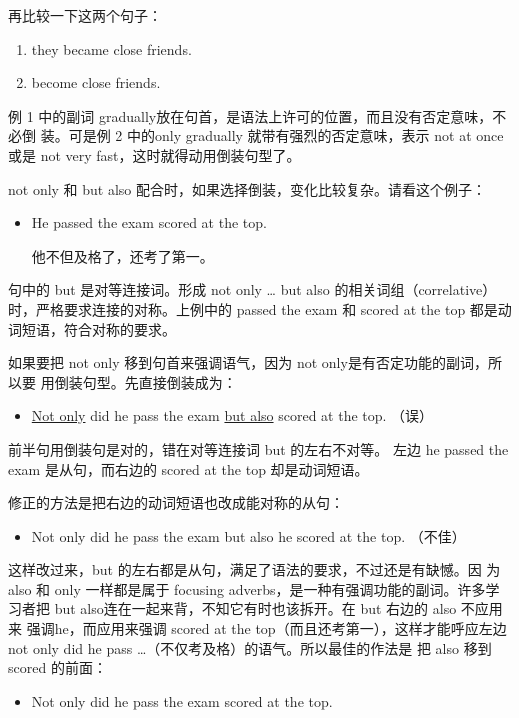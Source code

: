 再比较一下这两个句子：
\begin{enumerate}
\item {} they became close friends.
\item {} become close friends.
\end{enumerate}
例 1 中的副词 gradually放在句首，是语法上许可的位置，而且没有否定意味，不必倒
装。可是例 2 中的only gradually 就带有强烈的否定意味，表示 not at
once 或是 not very fast，这时就得动用倒装句型了。

not only 和 but also 配合时，如果选择倒装，变化比较复杂。请看这个例子：
\begin{itemize}
\item He  passed the exam  scored at the top.

  他不但及格了，还考了第一。
\end{itemize}
句中的 but 是对等连接词。形成 not only \ldots{} but also
的相关词组（correlative）时，严格要求连接的对称。上例中的 passed the
exam 和 scored at the top 都是动词短语，符合对称的要求。

如果要把 not only 移到句首来强调语气，因为 not only是有否定功能的副词，所以要
用倒装句型。先直接倒装成为：
\begin{itemize}
\item \ul{Not only} did he pass the exam \ul{but also} scored at the top. （误）
\end{itemize}

前半句用倒装句是对的，错在对等连接词 but 的左右不对等。 左边 he passed
the exam 是从句，而右边的 scored at the top 却是动词短语。

修正的方法是把右边的动词短语也改成能对称的从句：
\begin{itemize}
\item   Not only did he pass the exam but also he scored at the top. （不佳）
\end{itemize}
这样改过来，but 的左右都是从句，满足了语法的要求，不过还是有缺憾。因
为also 和 only 一样都是属于 focusing adverbs，是一种有强调功能的副词。许多学
习者把 but also连在一起来背，不知它有时也该拆开。在 but 右边的 also 不应用来
强调he，而应用来强调 scored at the top（而且还考第一），这样才能呼应左边 not
only did he pass \ldots（不仅考及格）的语气。所以最佳的作法是
把 also 移到scored 的前面：
\begin{itemize}
\item Not only did he pass the exam  scored at the top.
\end{itemize}

